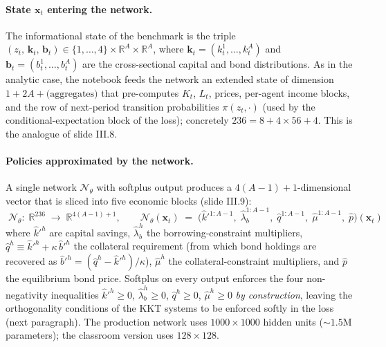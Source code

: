 \documentclass[11pt,a4paper]{report}
\newcommand{\x}{\bm{x}}
\newcommand{\R}{\mathbb{R}}
\begin{document}
\paragraph{State $\x_t$ entering the network.}
The informational state of the benchmark is the triple
\(
(z_t,\,\bm{k}_t,\,\bm{b}_t) \in \{1,\ldots,4\}\times\R^A\times\R^A
\),
where $\bm{k}_t = (k_t^1,\ldots,k_t^A)$ and $\bm{b}_t = (b_t^1,\ldots,b_t^A)$ are the cross-sectional capital and bond distributions.  As in the analytic case, the notebook feeds the network an extended state of dimension $1+2A+\text{(aggregates)}$ that pre-computes $K_t$, $L_t$, prices, per-agent income blocks, and the row of next-period transition probabilities $\pi(z_t,\cdot)$ (used by the conditional-expectation block of the loss); concretely $236 = 8 + 4\times 56 + 4$.  This is the analogue of slide III.8.

\paragraph{Policies approximated by the network.}
A single network $\mathcal{N}_\theta$ with softplus output produces a $4(A-1)+1$-dimensional vector that is sliced into five economic blocks (slide III.9):
\begin{equation}
\boxed{\;\mathcal{N}_\theta:\;\R^{236} \;\longrightarrow\; \R^{4(A-1)+1},\qquad
\mathcal{N}_\theta(\x_t) \;=\; \bigl(\hat k'^{1:A-1},\;\hat \lambda_b^{1:A-1},\;\hat q^{1:A-1},\;\hat \mu^{1:A-1},\;\hat p\bigr)(\x_t)\;}
\label{eq:olg56_policy}
\end{equation}
where $\hat k'^h$ are capital savings, $\hat\lambda_b^h$ the borrowing-constraint multipliers, $\hat q^h \equiv \hat k'^h + \kappa\,\hat b'^h$ the collateral requirement (from which bond holdings are recovered as $\hat b'^h = (\hat q^h - \hat k'^h)/\kappa$), $\hat\mu^h$ the collateral-constraint multipliers, and $\hat p$ the equilibrium bond price.  Softplus on every output enforces the four non-negativity inequalities $\hat k'^h\ge 0$, $\hat\lambda_b^h\ge 0$, $\hat q^h\ge 0$, $\hat\mu^h\ge 0$ \emph{by construction}, leaving the orthogonality conditions of the KKT systems to be enforced softly in the loss (next paragraph).  The production network uses $1000\times 1000$ hidden units ($\sim\!1.5$M parameters); the classroom version uses $128\times 128$.
\end{document}
